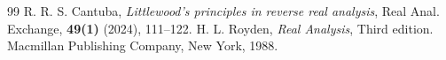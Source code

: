 \documentclass[10pt,a4paper]{amsart}
\begin{document}
\begin{thebibliography}{99}
 R. R. S. Cantuba, \textit{Littlewood's principles in reverse real analysis}, Real Anal. Exchange, \textbf{49(1)} (2024), 111--122.
 H. L. Royden, \textit{Real Analysis}, Third edition. Macmillan Publishing Company, New York, 1988.
\end{thebibliography}
\end{document}
